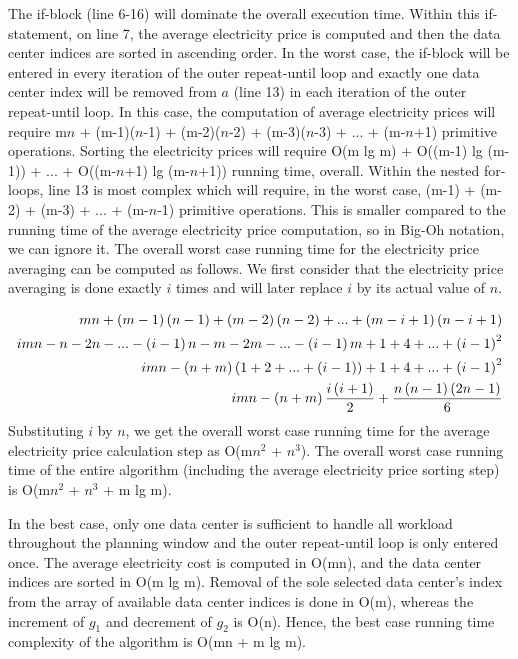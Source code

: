 The if-block (line 6-16) will dominate the overall execution time. Within this if-statement, on line 7, the average electricity price is computed and then the data center indices are sorted in ascending order. In the worst case, the if-block will be entered in every iteration of the outer repeat-until loop and exactly one data center index will be removed from $a$ (line 13) in each iteration of the outer repeat-until loop. In this case, the computation of average electricity prices will require m$n$ + (m-1)($n$-1) + (m-2)($n$-2) + (m-3)($n$-3) + ... + (m-$n$+1) primitive operations. Sorting the electricity prices will require O(m lg m) + O((m-1) lg (m-1)) +  ... + O((m-$n$+1) lg (m-$n$+1)) running time, overall. Within the nested for-loops, line 13 is most complex which will require, in the worst case, (m-1) + (m-2) + (m-3) + ... + (m-$n$-1) primitive operations. This is smaller compared to the running time of the average electricity price computation, so in Big-Oh notation, we can ignore it. The overall worst case running time for the electricity price averaging can be computed as follows. We first consider that the electricity price averaging is done exactly $i$ times and will later replace $i$ by its actual value of $n$.

\begin{align}
mn + \left(m-1\right) \left(n-1\right) + \left(m-2\right) \left(n-2\right) + ... + \left(m-i+1\right) \left(n-i+1\right)\notag \\
i mn - n - 2n - ... - \left(i-1\right)n - m - 2m - ... - \left(i-1\right)m + 1 + 4 + ... + \left(i-1\right)^2\notag \\
i m n - \left(n + m\right)\left(1 + 2 + ... + \left(i-1\right)\right) + 1 + 4 + ... + \left(i-1\right)^2\notag \\
i mn - \left(n + m\right)\frac{i\left(i+1\right)}{2} + \frac{n\left(n-1\right)\left(2n-1\right)}{6}\notag
\end{align}
Substituting $i$ by $n$, we get the overall worst case running time for the average electricity price calculation step as O(m$n^2$ + $n^3$). The overall worst case running time of the entire algorithm (including the average electricity price sorting step) is O(m$n^2$ + $n^3$ + m lg m).

In the best case, only one data center is sufficient to handle all workload throughout the planning window and the outer repeat-until loop is only entered once. The average electricity cost is computed in O(mn), and the data center indices are sorted in O(m lg m). Removal of the sole selected data center's index from the array of available data center indices is done in O(m), whereas the increment of $g_1$ and decrement of $g_2$ is O(n). Hence, the best case running time complexity of the algorithm is O(mn + m lg m).

